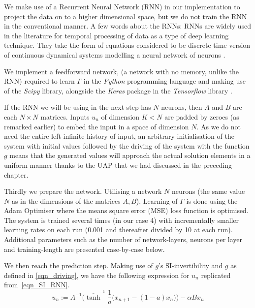 \documentclass[a4paper,12pt,twoside]{report}
\begin{document}
We make use of a Recurrent Neural Network (RNN) in our implementation to project the data on to a higher dimensional space, but we do not train the RNN in the conventional manner.  A few words about the RNNs: RNNs are widely used in the literature for temporal processing of data as a type of deep learning technique. They take the form of equations considered to be discrete-time version of continuous dynamical systems modelling a neural network of neurons \cite{jaeger2001echo}.

We implement a feedforward network, (a network with no memory, unlike the RNN) required to learn $\Gamma$ in the \emph{Python} programming language and making use of the \emph{Scipy} library, alongside the \emph{Keras} package in the \emph{Tensorflow} library .

If the RNN we will be using in the next step has $N$ neurons, then $A$ and $B$ are each $N\times{N}$ matrices. Inputs $u_n$ of dimension $K < N$ are padded by zeroes (as remarked earlier) to embed the input in a space of dimension $N$. As we do not need the entire left-infinite history of input, an arbitrary initialisation of the system with initial values followed by the driving of the system with the function $g$ means that the generated values will approach the actual solution elements in a uniform manner thanks to the UAP that we had discussed in the preceding chapter.

Thirdly we prepare the network. Utilising a network $N$ neurons (the same value $N$ as in the dimensions of the matrices $A,B$). Learning of $\Gamma$ is done using the Adam Optimiser where the means square error (MSE) loss function is optimised. The system is trained several times (in our case 4) with incrementally smaller learning rates on each run (0.001 and thereafter divided by 10 at each run). 
Additional parameters such as the number of network-layers, neurons per layer and training-length are presented case-by-case below.

We then reach the prediction step. Making use of $g$'s SI-invertibility and $g$ as defined in \eqref{eqn_driving}, we have the following expression for $u_n$ replicated from~\eqref{eqn_SI_RNN}.
\begin{equation*}
  u_n := A^{-1}\bigg(\overline{\tanh}^{^{-1}}\frac{1}{a}\Big(x_{n+1}-(1-a)x_n\Big) \bigg) - \alpha B x_n
\end{equation*}
    
\end{document}
